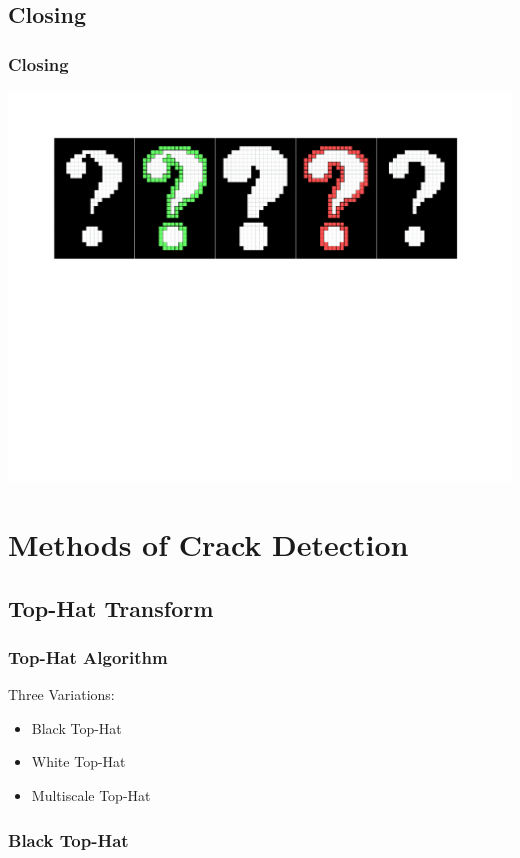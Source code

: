 \documentclass{beamer}
\begin{document}
\subsection[Closing]{Closing}

\begin{frame}
\frametitle{Closing}
\includegraphics[width=1\textwidth]{closing}
\end{frame}

\section[Methods of Crack Detection]{Methods of Crack Detection}

\subsection[Top-Hat Transform]{Top-Hat Transform}

\begin{frame}
\frametitle{Top-Hat Algorithm}
Three Variations:
\begin{itemize}
\item Black Top-Hat
\item White Top-Hat
\item Multiscale Top-Hat
\end{itemize}
\end{frame}

\subsubsection[Black Top-Hat]{Black Top-Hat}
\end{document}
